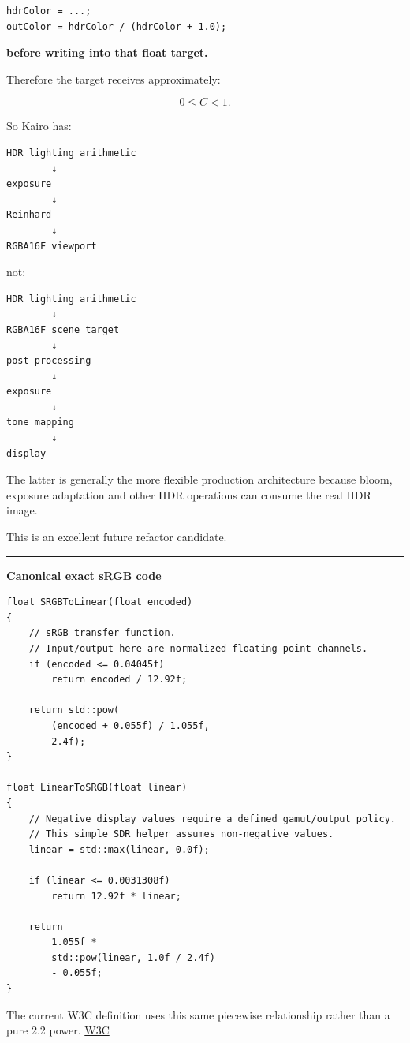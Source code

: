 \begin{verbatim}
hdrColor = ...;
outColor = hdrColor / (hdrColor + 1.0);
\end{verbatim}

\textbf{before writing into that float target.}

Therefore the target receives approximately:

\[
0\le C<1.
\]

So Kairo has:

\begin{verbatim}
HDR lighting arithmetic
        ↓
exposure
        ↓
Reinhard
        ↓
RGBA16F viewport
\end{verbatim}

not:

\begin{verbatim}
HDR lighting arithmetic
        ↓
RGBA16F scene target
        ↓
post-processing
        ↓
exposure
        ↓
tone mapping
        ↓
display
\end{verbatim}

The latter is generally the more flexible production architecture because bloom, exposure adaptation and other HDR operations can consume the real HDR image.

This is an excellent future refactor candidate.

\begin{center}\rule{0.5\linewidth}{0.5pt}\end{center}

\textbf{Canonical exact sRGB code}

\begin{verbatim}
float SRGBToLinear(float encoded)
{
    // sRGB transfer function.
    // Input/output here are normalized floating-point channels.
    if (encoded <= 0.04045f)
        return encoded / 12.92f;

    return std::pow(
        (encoded + 0.055f) / 1.055f,
        2.4f);
}

float LinearToSRGB(float linear)
{
    // Negative display values require a defined gamut/output policy.
    // This simple SDR helper assumes non-negative values.
    linear = std::max(linear, 0.0f);

    if (linear <= 0.0031308f)
        return 12.92f * linear;

    return
        1.055f *
        std::pow(linear, 1.0f / 2.4f)
        - 0.055f;
}
\end{verbatim}

The current W3C definition uses this same piecewise relationship rather than a pure 2.2 power. \href{https://www.w3.org/TR/2026/CRD-css-color-4-20261009/?utm_source=chatgpt.com}{W3C}

